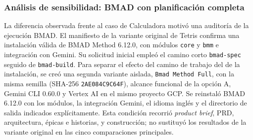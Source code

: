 \subsubsection{Análisis de sensibilidad: BMAD con planificación completa}
\label{subsubsec:bmad_tetris_ruta_completa}

La diferencia observada frente al caso de Calculadora motivó una auditoría de la ejecución BMAD. El manifiesto de la variante original de Tetris confirma una instalación válida de BMAD Method 6.12.0, con módulos \texttt{core} y \texttt{bmm} e integración con Gemini. Su solicitud inicial empleó el camino corto \texttt{bmad-spec} seguido de \texttt{bmad-build}. Para separar el efecto del camino de trabajo del de la instalación, se creó una segunda variante aislada, \texttt{Bmad Method Full}, con la misma semilla (SHA-256 \texttt{2AE084C9C64F}), alcance funcional de la opción A, Gemini CLI 0.60.0 y Vertex AI en el mismo proyecto GCP. Se reinstaló BMAD 6.12.0 con los módulos, la integración Gemini, el idioma inglés y el directorio de salida indicados explícitamente. Esta condición recorrió \textit{product brief}, PRD, arquitectura, épicas e historias, y construcción; no sustituyó los resultados de la variante original en las cinco comparaciones principales.

